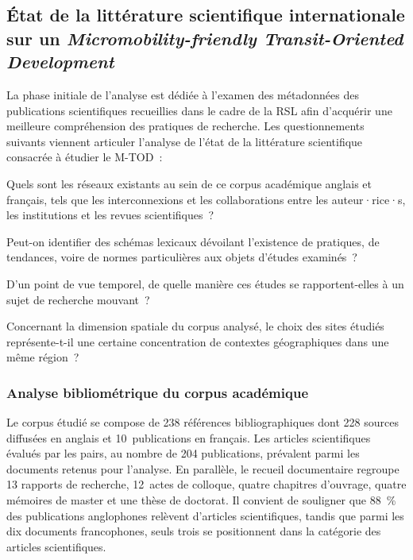 \begin{refsegment}
\subsection{État de la littérature scientifique internationale sur un \textsl{Micromobility-friendly Transit-Oriented Development}
    \label{chap2:etat-litterature-scientifique-internationale-btod}
    }
    
La phase initiale de l'analyse est dédiée à l'examen des métadonnées des publications scientifiques recueillies dans le cadre de la \acrshort{RSL} afin d'acquérir une meilleure compréhension des pratiques de recherche. Les questionnements suivants viennent articuler l'analyse de l'état de la littérature scientifique consacrée à étudier le \acrshort{M-TOD}~:
    \begin{customitemize}
        \item Quels sont les réseaux existants au sein de ce corpus académique anglais et français, tels que les interconnexions et les collaborations entre les auteur·rice·s, les institutions et les revues scientifiques~?
        \item Peut-on identifier des schémas lexicaux dévoilant l'existence de pratiques, de tendances, voire de normes particulières aux objets d'études examinés~?
        \item D'un point de vue temporel, de quelle manière ces études se rapportent-elles à un sujet de recherche mouvant~?
        \item Concernant la dimension spatiale du corpus analysé, le choix des sites étudiés représente-t-il une certaine concentration de contextes géographiques dans une même région~?
    \end{customitemize}%

\subsubsection*{Analyse bibliométrique du corpus académique
    \label{chap2:analyse-bibliometrique}
    }

Le corpus étudié se compose de 238 références bibliographiques dont 228 sources diffusées en anglais et 10~publications en français. Les articles scientifiques évalués par les pairs, au nombre de 204 publications, prévalent parmi les documents retenus pour l'analyse. En parallèle, le recueil documentaire regroupe 13 rapports de recherche, 12~actes de colloque, quatre chapitres d'ouvrage, quatre mémoires de master et une thèse de doctorat. Il convient de souligner que 88~\% des publications anglophones relèvent d'articles scientifiques, tandis que parmi les dix documents francophones, seuls trois se positionnent dans la catégorie des articles scientifiques.%


\end{refsegment}

